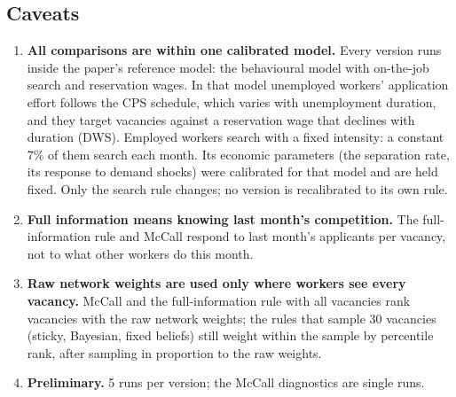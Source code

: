 \documentclass[10pt]{article}
\begin{document}
\normalsize
\normalsize
\subsection*{Caveats}
\begin{enumerate}[leftmargin=*]
  \item \textbf{All comparisons are within one calibrated model.} Every version runs inside the paper's
  reference model: the behavioural model with on-the-job search and reservation wages. In that model
  unemployed workers' application effort follows the CPS schedule, which varies with unemployment duration,
  and they target vacancies against a reservation wage that declines with duration (DWS). Employed workers search with a
  fixed intensity: a constant 7\% of them search each month. Its economic parameters (the separation rate, its response to demand
  shocks) were calibrated for that model and are held
  fixed. Only the search rule changes; no version is recalibrated to its own rule.
  \item \textbf{Full information means knowing last month's competition.} The full-information rule and McCall respond
  to last month's applicants per vacancy, not to what other workers do this month.
  \item \textbf{Raw network weights are used only where workers see every vacancy.} McCall and the
  full-information rule with all vacancies rank vacancies with the raw network weights; the rules that sample 30
  vacancies (sticky, Bayesian, fixed beliefs) still weight within the sample by percentile
  rank, after sampling in proportion to the raw weights.
  \item \textbf{Preliminary.} 5 runs per version; the McCall diagnostics are single runs.
\end{enumerate}
\end{document}

